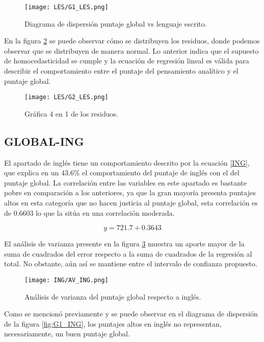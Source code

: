 \documentclass{article}
\begin{document}
\begin{figure}[H]
    \centering
    \texttt{[image: LES/G1\_LES.png]}
    \caption{Diagrama de dispersión puntaje global vs lenguaje escrito.}
    \label{fig:G1_LES}
\end{figure}

En la figura \ref{fig:G2_LES} se puede observar cómo se distribuyen los residuos, donde podemos observar que se distribuyen de manera normal. Lo anterior indica que el supuesto de homocedasticidad se cumple y la ecuación de regresión lineal es válida para describir el comportamiento entre el puntaje del pensamiento analítico y el puntaje global.

\begin{figure}[H]
    \centering
    \texttt{[image: LES/G2\_LES.png]}
    \caption{Gráfica 4 en 1 de los residuos.}
    \label{fig:G2_LES}
\end{figure}

\subsection{GLOBAL-ING}

El apartado de inglés tiene un comportamiento descrito por la ecuación \ref{ING}, que explica en un $43.6\%$ el comportamiento del puntaje de inglés con el del puntaje global. La correlación entre las variables en este apartado es bastante pobre en comparación a los anteriores, ya que la gran mayoría presenta puntajes altos en esta categoría que no hacen justicia al puntaje global, esta correlación es de $0.6603$ lo que la sitúa en una correlación moderada.

\begin{equation}
    y = 721.7 + 0.3643
    \label{ING}
\end{equation}

El análisis de varianza presente en la figura \ref{fig:AV_ING} muestra un aporte mayor de la suma de cuadrados del error respecto a la suma de cuadrados de la regresión al total. No obstante, aún así se mantiene entre el intervalo de confianza propuesto.

\begin{figure}[H]
    \centering
    \texttt{[image: ING/AV\_ING.png]}
    \caption{Análisis de varianza del puntaje global respecto a inglés.}
    \label{fig:AV_ING}
\end{figure}

Como se mencionó previamente y se puede observar en el diagrama de dispersión de la figura \ref{fig:G1_ING}, los puntajes altos en inglés no representan, necesariamente, un buen puntaje global.
\end{document}
